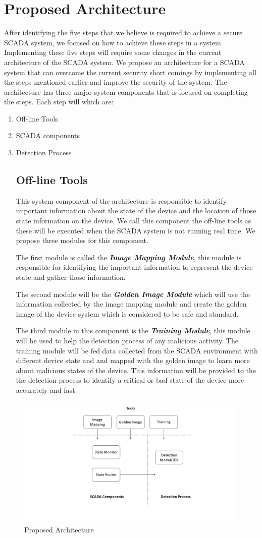 \documentclass[letterpaper, 10 pt, conference]{ieeeconf}  %
\begin{document}
\section{Proposed Architecture}
After identifying the five steps that we believe is required to achieve a secure SCADA system, we focused on how to achieve these steps in a system. Implementing these five steps will require some changes in the current architecture of the SCADA system. We propose an architecture for a SCADA system that can overcome the current security short comings by implementing all the steps mentioned earlier and improve the security of the system. The architecture has three major system components that is focused on completing the steps. Each step will which are:
\begin{enumerate}
\item Off-line Tools
\item SCADA components
\item Detection Process
\subsection{Off-line Tools}
This system component of the architecture is responsible to identify important information about the state of the device and the location of those state information on the device. We call this component the off-line tools as these will be executed when the SCADA system is not running real time. We propose three modules for this component. 
\par The first module is called the \textit{\textbf{Image Mapping Module}}, this module is responsible for identifying the important information to represent the device state and gather those information.
\par The second module will be the \textit{\textbf{Golden Image Module}} which will use the information collected by the image mapping module and create the golden image of the device system which is considered to be safe and standard. \par The third module in this component is the \textit{\textbf{Training Module}}, this module will be used to help the detection process of any malicious activity. The training module will be fed data collected from the SCADA environment with different device state and and mapped with the golden image to learn more about malicious states of the device. This information will be provided to the the detection process to identify a critical or bad state of the device more accurately and fast.
\end{enumerate}
\begin{figure}
\centering
\includegraphics[width=.4\textwidth]{architecture}
\caption{Proposed Architecture}
\end{figure}
\end{document}
